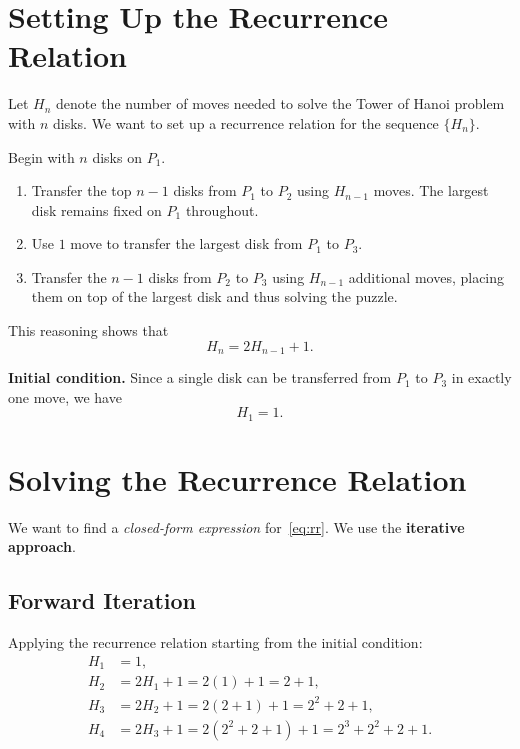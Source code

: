 \documentclass[12pt, a4paper]{article}
\theoremstyle{definition}
\theoremstyle{plain}
\theoremstyle{remark}
\begin{document}
\section{Setting Up the Recurrence Relation}

Let $H_n$ denote the number of moves needed to solve the Tower of Hanoi
problem with $n$ disks. We want to set up a recurrence relation for the
sequence $\{H_n\}$.

\bigskip

Begin with $n$ disks on $P_1$.
\begin{enumerate}[label=\textbf{Step \arabic*.}, leftmargin=*, itemsep=4pt]
  \item Transfer the top $n-1$ disks from $P_1$ to $P_2$ using $H_{n-1}$
        moves. The largest disk remains fixed on $P_1$ throughout.
  \item Use $1$ move to transfer the largest disk from $P_1$ to $P_3$.
  \item Transfer the $n-1$ disks from $P_2$ to $P_3$ using $H_{n-1}$
        additional moves, placing them on top of the largest disk and
        thus solving the puzzle.
\end{enumerate}

This reasoning shows that
\begin{equation}
  H_n = 2H_{n-1} + 1. \label{eq:rr}
\end{equation}

\noindent\textbf{Initial condition.}
Since a single disk can be transferred from $P_1$ to $P_3$ in exactly one
move, we have
\[
  H_1 = 1.
\]

\pagebreak

\section{Solving the Recurrence Relation}

We want to find a \emph{closed-form expression} for~\eqref{eq:rr}.
We use the \textbf{iterative approach}.

\subsection{Forward Iteration}

Applying the recurrence relation starting from the initial condition:
\begin{align*}
  H_1 &= 1,\\
  H_2 &= 2H_1 + 1 = 2(1) + 1 = 2 + 1,\\
  H_3 &= 2H_2 + 1 = 2(2+1) + 1 = 2^2 + 2 + 1,\\
  H_4 &= 2H_3 + 1 = 2(2^2+2+1) + 1 = 2^3 + 2^2 + 2 + 1.
\end{align*}
\end{document}
